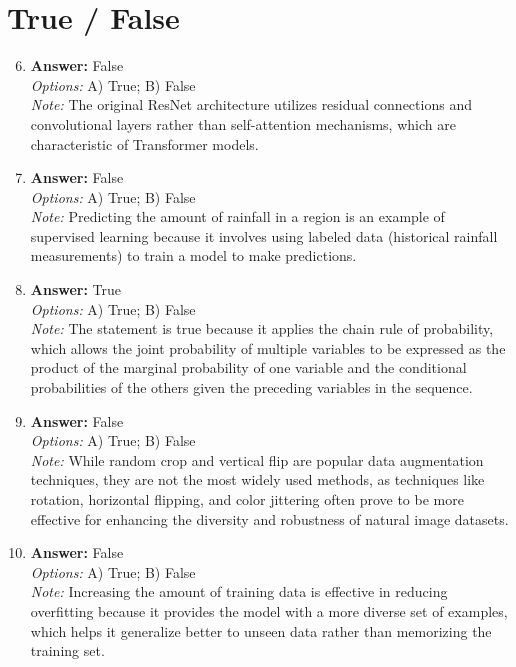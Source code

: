 \documentclass[12pt]{article}
\begin{document}
\section*{True / False}
\begin{enumerate}[label=\arabic*.]
\setcounter{enumi}{5}
\item \textbf{Answer:} False
\\ \textit{Options:} A) True; B) False
\\ \textit{Note:} The original ResNet architecture utilizes residual connections and convolutional layers rather than self-attention mechanisms, which are characteristic of Transformer models.
\item \textbf{Answer:} False
\\ \textit{Options:} A) True; B) False
\\ \textit{Note:} Predicting the amount of rainfall in a region is an example of supervised learning because it involves using labeled data (historical rainfall measurements) to train a model to make predictions.
\item \textbf{Answer:} True
\\ \textit{Options:} A) True; B) False
\\ \textit{Note:} The statement is true because it applies the chain rule of probability, which allows the joint probability of multiple variables to be expressed as the product of the marginal probability of one variable and the conditional probabilities of the others given the preceding variables in the sequence.
\item \textbf{Answer:} False
\\ \textit{Options:} A) True; B) False
\\ \textit{Note:} While random crop and vertical flip are popular data augmentation techniques, they are not the most widely used methods, as techniques like rotation, horizontal flipping, and color jittering often prove to be more effective for enhancing the diversity and robustness of natural image datasets.
\item \textbf{Answer:} False
\\ \textit{Options:} A) True; B) False
\\ \textit{Note:} Increasing the amount of training data is effective in reducing overfitting because it provides the model with a more diverse set of examples, which helps it generalize better to unseen data rather than memorizing the training set.
\end{enumerate}
\end{document}
